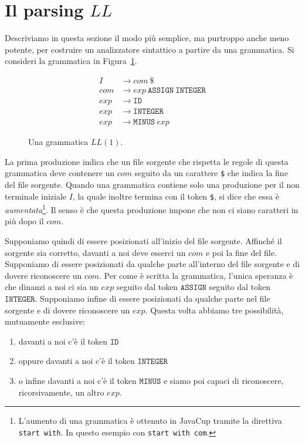 \section{Il parsing $\mathit{LL}$}\label{sec:ll}
%
Descriviamo in questa sezione il modo pi\`u semplice, ma purtroppo anche
meno potente, per costruire un analizzatore sintattico a partire
da una grammatica. Si consideri la grammatica in Figura~\ref{fig:ll1_grammar}.
%
\begin{figure}[t]
\begin{align*}
  \mathit{I}&\to\mathit{com}\ \mathtt{\$}\\
  \mathit{com}&\to\mathit{exp}\ \mathtt{ASSIGN}\ \mathtt{INTEGER}\\
  \mathit{exp}&\to\mathtt{ID}\\
  \mathit{exp}&\to\mathtt{INTEGER}\\
  \mathit{exp}&\to\mathtt{MINUS}\ \mathit{exp}
\end{align*}
\caption{Una grammatica $\mathit{LL}(1)$.}\label{fig:ll1_grammar}
\end{figure}
%
La prima produzione indica che un file sorgente che rispetta le regole
di questa grammatica deve contenere un $\mathit{com}$ seguito da
un carattere \texttt{\$} che indica la fine del file sorgente.
Quando una grammatica contiene solo una produzione per il non terminale
iniziale $I$, la quale inoltre termina con il token \texttt{\$},
si dice che essa \`e
\emph{aumentata}\footnote{L'aumento di una grammatica \`e ottenuto
in JavaCup tramite la direttiva \texttt{start with}. In questo esempio
con \texttt{start with com}.}.
Il senso \`e che questa produzione impone che non ci siano
caratteri in pi\`u dopo il $\mathit{com}$.

Supponiamo quindi di essere posizionati all'inizio del file sorgente.
Affinch\'e il sorgente sia corretto, davanti a noi deve esserci un
$\mathit{com}$ e poi la fine del file. Supponiamo di essere
posizionati da qualche parte all'interno del file sorgente e di dovere
riconoscere un $\mathit{com}$. Per come \`e scritta la grammatica,
l'unica speranza \`e che dinanzi a noi ci sia un $\mathit{exp}$ seguito dal
token $\mathtt{ASSIGN}$ seguito dal token $\mathtt{INTEGER}$.
Supponiamo infine di essere posizionati da qualche parte nel file sorgente
e di dovere riconoscere un $\mathit{exp}$. Questa volta abbiamo tre
possibilit\`a, mutuamente esclusive:
%
\begin{enumerate}
\item davanti a noi c'\`e il token $\mathtt{ID}$
\item oppure davanti a noi c'\`e il token $\mathtt{INTEGER}$
\item o infine davanti a noi c'\`e il token $\mathtt{MINUS}$ e siamo
      poi capaci di riconoscere, ricorsivamente, un altro $\mathit{exp}$.
\end{enumerate}

